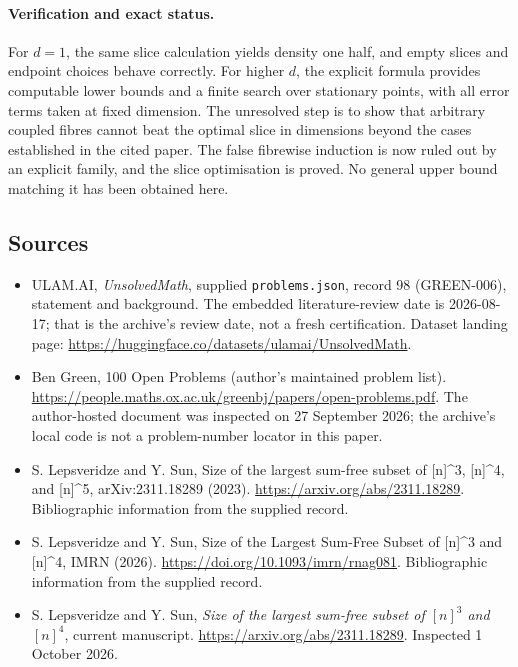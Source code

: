 \documentclass[11pt,a4paper]{article}
\begin{document}
\paragraph{Verification and exact status.}
For $d=1$, the same slice calculation yields density one half, and empty slices and endpoint choices behave correctly. For higher $d$, the explicit formula provides computable lower bounds and a finite search over stationary points, with all error terms taken at fixed dimension. The unresolved step is to show that arbitrary coupled fibres cannot beat the optimal slice in dimensions beyond the cases established in the cited paper. The false fibrewise induction is now ruled out by an explicit family, and the slice optimisation is proved. No general upper bound matching it has been obtained here.

\subsection{Sources}

{\small

\begin{itemize}

\item[\hypertarget{source:98:1}{S1}] ULAM.AI, \emph{UnsolvedMath}, supplied \texttt{problems.json}, record 98 (GREEN-006), statement and background. The embedded literature-review date is 2026-08-17; that is the archive’s review date, not a fresh certification. Dataset landing page: \url{https://huggingface.co/datasets/ulamai/UnsolvedMath}.

\item[\hypertarget{source:98:2}{S2}] Ben Green, 100 Open Problems (author’s maintained problem list). \url{https://people.maths.ox.ac.uk/greenbj/papers/open-problems.pdf}. The author-hosted document was inspected on 27 September 2026; the archive’s local code is not a problem-number locator in this paper.

\item[\hypertarget{source:98:3}{S3}] S. Lepsveridze and Y. Sun, Size of the largest sum-free subset of [n]\textasciicircum{}3, [n]\textasciicircum{}4, and [n]\textasciicircum{}5, arXiv:2311.18289 (2023). \url{https://arxiv.org/abs/2311.18289}. Bibliographic information from the supplied record.

\item[\hypertarget{source:98:4}{S4}] S. Lepsveridze and Y. Sun, Size of the Largest Sum-Free Subset of [n]\textasciicircum{}3 and [n]\textasciicircum{}4, IMRN (2026). \url{https://doi.org/10.1093/imrn/rnag081}. Bibliographic information from the supplied record.

\item[E1] S. Lepsveridze and Y. Sun, \emph{Size of the largest sum-free subset of $[n]^3$ and $[n]^4$}, current manuscript. \url{https://arxiv.org/abs/2311.18289}. Inspected 1 October 2026.

\end{itemize}

}

\label{end:98}
\end{document}
